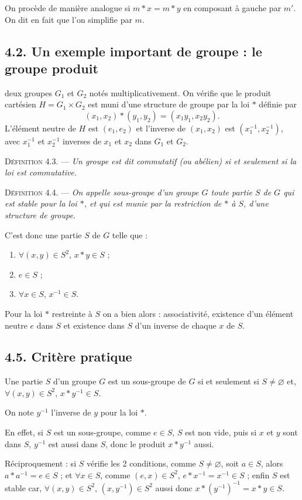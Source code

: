 On procède de manière analogue si $m*x=m*y$ en composant à gauche par $m'$. On dit en fait que l'on simplifie par $m$.

\subsection*{4.2. Un exemple important de groupe : le groupe produit}
 deux groupes $G_1$ et $G_2$ notés multiplicativement. On vérifie que le produit cartésien $H=G_1\times G_2$ est muni d'une structure de groupe par la loi $*$ définie par
\[
(x_1,x_2)*(y_1,y_2)=(x_1y_1,x_2y_2).
\]
L'élément neutre de $H$ est $(e_1,e_2)$ et l'inverse de $(x_1,x_2)$ est $(x_1^{-1},x_2^{-1})$, avec $x_1^{-1}$ et $x_2^{-1}$ inverses de $x_1$ et $x_2$ dans $G_1$ et $G_2$.

\medskip\noindent\textsc{Définition 4.3.} --- \emph{Un groupe est dit commutatif (ou abélien) si et seulement si la loi est commutative.}

\medskip\noindent\textsc{Définition 4.4.} --- \emph{On appelle sous-groupe d'un groupe $G$ toute partie $S$ de $G$ qui est stable pour la loi $*$, et qui est munie par la restriction de $*$ à $S$, d'une structure de groupe.}

C'est donc une partie $S$ de $G$ telle que :
\begin{enumerate}[label=\arabic*),leftmargin=2.1em]
\item $\forall(x,y)\in S^2$, $x*y\in S$ ;
\item $e\in S$ ;
\item $\forall x\in S$, $x^{-1}\in S$.
\end{enumerate}
Pour la loi $*$ restreinte à $S$ on a bien alors : associativité, existence d'un élément neutre $e$ dans $S$ et existence dans $S$ d'un inverse de chaque $x$ de $S$.

\subsection*{4.5. Critère pratique}
Une partie $S$ d'un groupe $G$ est un sous-groupe de $G$ si et seulement si $S\ne\varnothing$ et, $\forall(x,y)\in S^2$, $x*y^{-1}\in S$.

On note $y^{-1}$ l'inverse de $y$ pour la loi $*$.

En effet, si $S$ est un sous-groupe, comme $e\in S$, $S$ est non vide, puis si $x$ et $y$ sont dans $S$, $y^{-1}$ est aussi dans $S$, donc le produit $x*y^{-1}$ aussi.

Réciproquement : si $S$ vérifie les 2 conditions, comme $S\ne\varnothing$, soit $a\in S$, alors $a*a^{-1}=e\in S$ ; et $\forall x\in S$, comme $(e,x)\in S^2$, $e*x^{-1}=x^{-1}\in S$ ; enfin $S$ est stable car, $\forall(x,y)\in S^2$, $(x,y^{-1})\in S^2$ aussi donc $x*(y^{-1})^{-1}=x*y\in S$. \bookend

